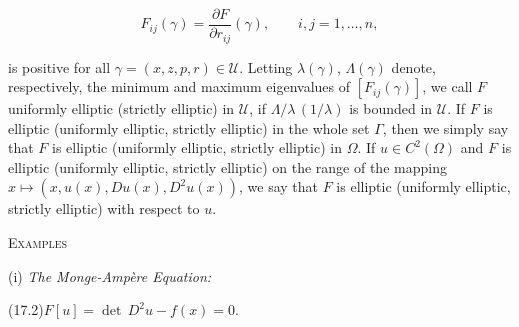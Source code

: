 \[
F_{ij}(\gamma) = \frac{\partial F}{\partial r_{ij}}(\gamma), \qquad i, j = 1, \ldots, n,
\]

\noindent is positive for all $\gamma = (x, z, p, r) \in \mathcal U$. Letting $\lambda(\gamma)$, $\Lambda(\gamma)$ denote, respectively, the
minimum and maximum eigenvalues of $[F_{ij}(\gamma)]$, we call $F$ uniformly elliptic (strictly
elliptic) in $\mathcal U$, if $\Lambda/\lambda\,(1/\lambda)$ is bounded in $\mathcal U$. If $F$ is elliptic (uniformly elliptic, strictly
elliptic) in the whole set $\Gamma$, then we simply say that $F$ is elliptic (uniformly elliptic,
strictly elliptic) in $\Omega$. If $u \in C^2(\Omega)$ and $F$ is elliptic (uniformly elliptic, strictly elliptic)
on the range of the mapping $x \mapsto (x,u(x),Du(x),D^2u(x))$, we say that $F$ is elliptic
(uniformly elliptic, strictly elliptic) with respect to $u$.

\bigskip

\noindent \textsc{Examples}

\medskip

\noindent (i) \textit{The Monge-Amp\`ere Equation:}

\medskip

\noindent (17.2)\quad $F[u] = \det\, D^2u - f(x) = 0.$
